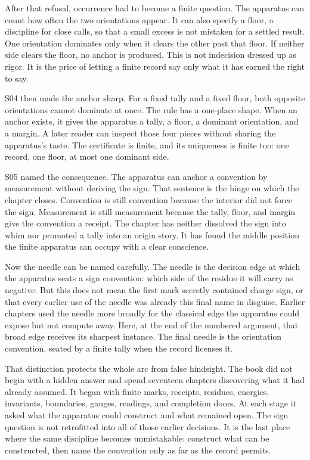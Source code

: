 After that refusal, occurrence had to become a finite question. The apparatus
can count how often the two orientations appear. It can also specify a floor, a
discipline for close calls, so that a small excess is not mistaken for a
settled result. One orientation dominates only when it clears the other past
that floor. If neither side clears the floor, no anchor is produced. This is
not indecision dressed up as rigor. It is the price of letting a finite record
say only what it has earned the right to say.

S04 then made the anchor sharp. For a fixed tally and a fixed floor, both
opposite orientations cannot dominate at once. The rule has a one-place shape.
When an anchor exists, it gives the apparatus a tally, a floor, a dominant
orientation, and a margin. A later reader can inspect those four pieces without
sharing the apparatus's taste. The certificate is finite, and its uniqueness is
finite too: one record, one floor, at most one dominant side.

S05 named the consequence. The apparatus can anchor a convention by
measurement without deriving the sign. That sentence is the hinge on which the
chapter closes. Convention is still convention because the interior did not
force the sign. Measurement is still measurement because the tally, floor, and
margin give the convention a receipt. The chapter has neither dissolved the
sign into whim nor promoted a tally into an origin story. It has found the
middle position the finite apparatus can occupy with a clear conscience.

Now the needle can be named carefully. The needle is the decision edge at which
the apparatus seats a sign convention: which side of the residue it will carry
as negative. But this does not mean the first mark secretly contained charge
sign, or that every earlier use of the needle was already this final name in
disguise. Earlier chapters used the needle more broadly for the classical edge
the apparatus could expose but not compute away. Here, at the end of the
numbered argument, that broad edge receives its sharpest instance. The final
needle is the orientation convention, seated by a finite tally when the record
licenses it.

That distinction protects the whole arc from false hindsight. The book did not
begin with a hidden answer and spend seventeen chapters discovering what it had
already assumed. It began with finite marks, receipts, residues, energies,
invariants, boundaries, gauges, readings, and completion doors. At each stage it
asked what the apparatus could construct and what remained open. The sign
question is not retrofitted into all of those earlier decisions. It is the last
place where the same discipline becomes unmistakable: construct what can be
constructed, then name the convention only as far as the record permits.

